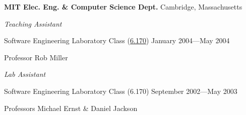 \documentclass[letter]{article}
\begin{document}
\vspace{\baselineskip}
\par
{\bf MIT Elec. Eng. \& Computer Science Dept.} \hfill Cambridge, Massachusetts

\vspace{0.5\baselineskip}
\par
{\em Teaching Assistant}
\par
Software Engineering Laboratory Class (\href{http://courses.csail.mit.edu/6.170/old-www/2004-Spring/admin-info/generalinfo.html#Staff}{6.170}) \hfill January 2004---May 2004
\par
Professor Rob Miller

\vspace{0.5\baselineskip}
\par
{\em Lab Assistant}
\par
Software Engineering Laboratory Class (6.170) \hfill September 2002---May 2003
\par
Professors Michael Ernst \& Daniel Jackson
\par
\end{document}
